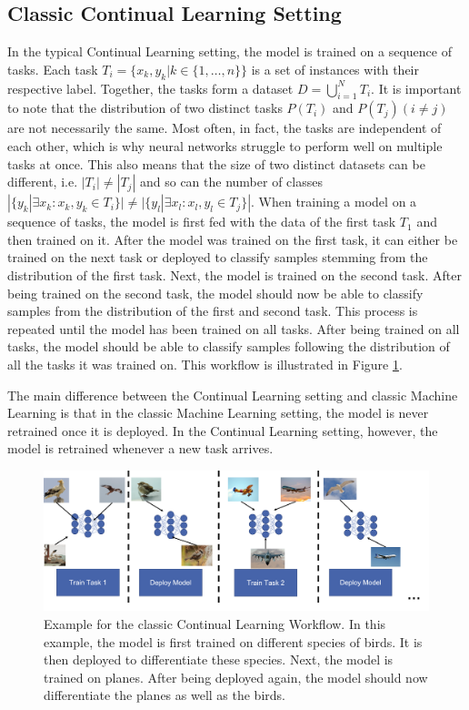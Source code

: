 \subsection{Classic Continual Learning Setting}
\label{sec:Methodology:CLSetting}
In the typical Continual Learning setting, the model is trained on a sequence of tasks. Each task $T_i = \{x_k,y_k | k \in \{1,\ldots,n\}\}$ is a set
of instances with their respective label. Together, the tasks form a dataset $D = \bigcup\limits_{i=1}^{N} T_i$. It is important to note that
the distribution of two distinct tasks $P(T_i)$  and $P(T_j) (i \neq j)$ are not necessarily the same. Most often, in fact, the tasks are independent
of each other, which is why neural networks struggle to perform well on multiple tasks at once. This also means that the size of two distinct datasets
can be different, i.e. $|T_i| \neq |T_j|$ and so can the number of classes $|\{y_k | \exists x_k: x_k,y_k \in T_i \}| \neq |\{y_l | \exists x_l: x_l,y_l
\in T_j\}|$. When training a model on a sequence of tasks, the model is first fed with the data of the first task $T_1$ and then trained on it. 
After the model was trained on the first task, it can either be trained on the next task or deployed to classify samples stemming from the
distribution of the first task. Next, the model is trained on the second task. After being trained on the second task, the model should now be able to
classify samples from the distribution of the first and second task. This process is repeated until the model has been trained on all
tasks. After being trained on all tasks, the model should be able to classify samples following the distribution of all the tasks it was trained on.
This workflow is illustrated in Figure \ref{fig:CLWorkflow}. \par
The main difference between the Continual Learning setting and classic Machine Learning is that in the classic Machine Learning setting, the model
is never retrained once it is deployed. In the Continual Learning setting, however, the model is retrained whenever a new task arrives.

\begin{figure}[ht]
    \centering
    \includegraphics[width=.9\linewidth]{images/CL_workflow.png}
    \caption[Continual Learning Workflow]{Example for the classic Continual Learning Workflow. In this example, the model is first trained on different species of
    birds. It is then deployed to differentiate these species. Next, the model is trained on planes. After being deployed again, the model should now differentiate
    the planes as well as the birds.}
    \label{fig:CLWorkflow}
  \end{figure}

